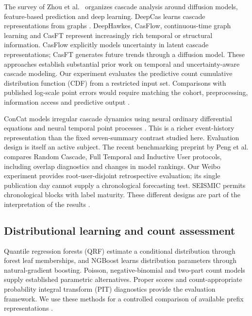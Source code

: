 The survey of Zhou et al.~\cite{zhou2021} organizes cascade analysis around diffusion models, feature-based prediction and deep learning. DeepCas learns cascade representations from graphs \cite{deepcas2016}. DeepHawkes, CasFlow, continuous-time graph learning and CasFT represent increasingly rich temporal or structural information. CasFlow explicitly models uncertainty in latent cascade representations; CasFT generates future trends through a diffusion model. These approaches establish substantial prior work on temporal and uncertainty-aware cascade modeling. Our experiment evaluates the predictive count cumulative distribution function (CDF) from a restricted input set. Comparisons with published log-scale point errors would require matching the cohort, preprocessing, information access and predictive output \cite{deephawkes2017,casflow2023,ctcp2023,casft2024}.

ConCat models irregular cascade dynamics using neural ordinary differential equations and neural temporal point processes \cite{concat2025}. This is a richer event-history representation than the fixed seven-summary contrast studied here. Evaluation design is itself an active subject. The recent benchmarking preprint by Peng et al. compares Random Cascade, Full Temporal and Inductive User protocols, including overlap diagnostics and changes in model rankings. Our Weibo experiment provides root-user-disjoint retrospective evaluation; its single publication day cannot supply a chronological forecasting test. SEISMIC permits chronological blocks with label maturity. These different designs are part of the interpretation of the results \cite{cascadebench2026}.

\hypertarget{distributional-learning-and-count-assessment}{%
\subsection{Distributional learning and count assessment}}

Quantile regression forests (QRF) estimate a conditional distribution through forest leaf memberships, and NGBoost learns distribution parameters through natural-gradient boosting. Poisson, negative-binomial and two-part count models supply established parametric alternatives. Proper scores and count-appropriate probability integral transform (PIT) diagnostics provide the evaluation framework. We use these methods for a controlled comparison of available prefix representations \cite{qrf2006,ngboost2020,counts2008,czado2009,scoring2019}.

